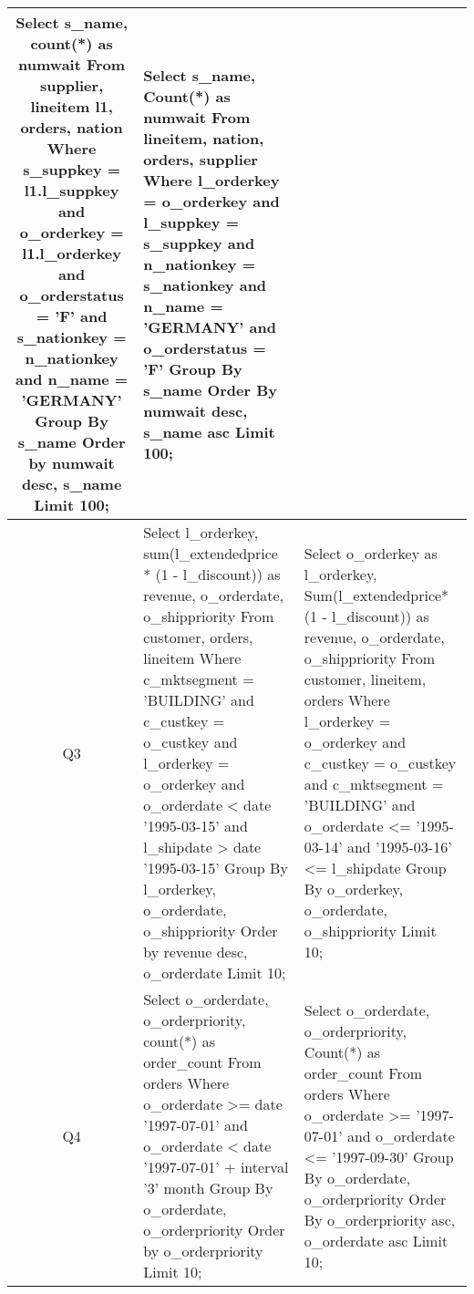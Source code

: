\begin{center}
\begin{supertabular}{|c|p{7cm}|p{7cm}|}
\footnotesize{Select s\_name, count(*) as numwait From supplier, lineitem l1, orders, nation         Where s\_suppkey = l1.l\_suppkey and o\_orderkey = l1.l\_orderkey and o\_orderstatus = 'F' and         s\_nationkey = n\_nationkey and n\_name = 'GERMANY'         Group By s\_name Order by numwait desc, s\_name Limit 100;} &
\footnotesize{Select s\_name, Count(*) as numwait  From lineitem, nation, orders, supplier   Where l\_orderkey = o\_orderkey  and l\_suppkey = s\_suppkey  and n\_nationkey = s\_nationkey  and n\_name = 'GERMANY'  and o\_orderstatus = 'F'   Group By s\_name   Order By numwait desc, s\_name asc   Limit 100;} \\\hline\footnotesize{Q3} &
\footnotesize{Select l\_orderkey, sum(l\_extendedprice * (1 - l\_discount)) as revenue, o\_orderdate, o\_shippriority        From customer, orders, lineitem        Where c\_mktsegment = 'BUILDING' and c\_custkey = o\_custkey and l\_orderkey = o\_orderkey and        o\_orderdate < date '1995-03-15' and l\_shipdate > date '1995-03-15'        Group By l\_orderkey, o\_orderdate, o\_shippriority        Order by revenue desc, o\_orderdate Limit 10;} &
\footnotesize{Select o\_orderkey as l\_orderkey, Sum(l\_extendedprice*(1 - l\_discount)) as revenue, o\_orderdate, o\_shippriority  From customer, lineitem, orders   Where l\_orderkey = o\_orderkey  and c\_custkey = o\_custkey  and c\_mktsegment = 'BUILDING'  and o\_orderdate <= '1995-03-14'  and '1995-03-16' <= l\_shipdate   Group By o\_orderkey, o\_orderdate, o\_shippriority   Limit 10;} \\\hline\footnotesize{Q4} &
\footnotesize{Select o\_orderdate, o\_orderpriority, count(*) as order\_count        From orders        Where o\_orderdate >= date '1997-07-01' and o\_orderdate < date '1997-07-01' + interval '3' month        Group By o\_orderdate, o\_orderpriority Order by o\_orderpriority Limit 10;} &
\footnotesize{Select o\_orderdate, o\_orderpriority, Count(*) as order\_count  From orders   Where o\_orderdate  >= '1997-07-01' and o\_orderdate <= '1997-09-30'   Group By o\_orderdate, o\_orderpriority   Order By o\_orderpriority asc, o\_orderdate asc   Limit 10;} \\\hline\end{supertabular}
\end{center}
\twocolumn
